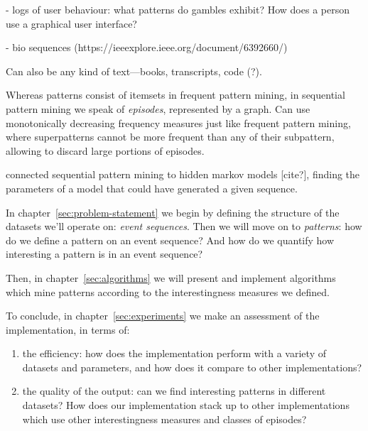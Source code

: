 - logs of user behaviour: what patterns do gambles exhibit? How does a person use a graphical user interface?

- bio sequences (https://ieeexplore.ieee.org/document/6392660/)

Can also be any kind of text---books, transcripts, code (?).

Whereas patterns consist of itemsets in frequent pattern mining, in sequential pattern mining we speak of \emph{episodes}, represented by a graph. Can use monotonically decreasing frequency measures just like frequent pattern mining, where superpatterns cannot be more frequent than any of their subpattern, allowing to discard large portions of episodes.

\cite{laxman2005discovering} connected sequential pattern mining to hidden markov models [cite?], finding the parameters of a model that could have generated a given sequence.



In chapter~\ref{sec:problem-statement} we begin by defining the structure of the datasets we'll operate on: \emph{event sequences}. Then we will move on to \emph{patterns}: how do we define a pattern on an event sequence?
And how do we quantify how interesting a pattern is in an event sequence?

Then, in chapter~\ref{sec:algorithms} we will present and implement algorithms which mine patterns according to the interestingness measures we defined.

To conclude, in chapter~\ref{sec:experiments} we make an assessment of the implementation, in terms of:

\begin{enumerate}
\item the efficiency: how does the implementation perform with a variety of datasets and parameters, and how does it compare to other implementations?
\item the quality of the output: can we find interesting patterns in different datasets? How does our implementation stack up to other implementations which use other interestingness measures and classes of episodes?
\end{enumerate}
